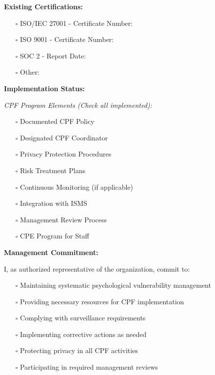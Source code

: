 \documentclass[11pt,a4paper]{article}
\begin{document}
\textbf{Existing Certifications:}
\begin{itemize}
\item[$\square$] ISO/IEC 27001 - Certificate Number: \underline{\hspace{6cm}}
\item[$\square$] ISO 9001 - Certificate Number: \underline{\hspace{6cm}}
\item[$\square$] SOC 2 - Report Date: \underline{\hspace{6cm}}
\item[$\square$] Other: \underline{\hspace{10cm}}
\end{itemize}

\textbf{Implementation Status:}

\textit{CPF Program Elements (Check all implemented):}
\begin{itemize}
\item[$\square$] Documented CPF Policy
\item[$\square$] Designated CPF Coordinator
\item[$\square$] Privacy Protection Procedures
\item[$\square$] Risk Treatment Plans
\item[$\square$] Continuous Monitoring (if applicable)
\item[$\square$] Integration with ISMS
\item[$\square$] Management Review Process
\item[$\square$] CPE Program for Staff
\end{itemize}

\textbf{Management Commitment:}

I, as authorized representative of the organization, commit to:
\begin{itemize}
\item[$\square$] Maintaining systematic psychological vulnerability management
\item[$\square$] Providing necessary resources for CPF implementation
\item[$\square$] Complying with surveillance requirements
\item[$\square$] Implementing corrective actions as needed
\item[$\square$] Protecting privacy in all CPF activities
\item[$\square$] Participating in required management reviews
\end{itemize}
\end{document}
